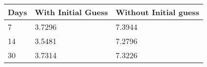 \begin{tabular}{lll}
Days & With Initial Guess & Without Initial guess \\ 
\hline 
7 & 3.7296 & 7.3944 \\ 
14 & 3.5481 & 7.2796 \\ 
30 & 3.7314 & 7.3226 \\ 
\hline 
\end{tabular}